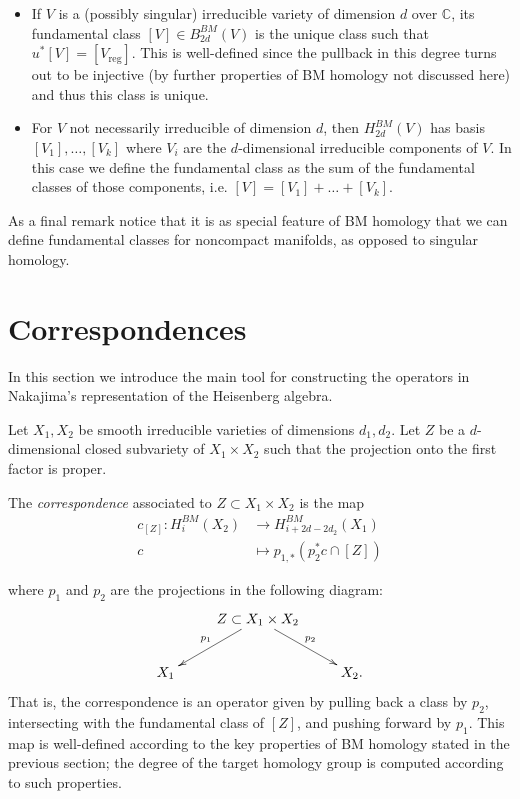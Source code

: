 \begin{enumerate}
\begin{itemize}
\item If $V$ is a (possibly singular)
irreducible variety of dimension $d$
over $\mathbb{C}$, its fundamental class
$[V] \in B_{2d}^{BM}(V)$
is the unique class such that
$u^* [V]=[V_{\text{reg}}]$.
This is well-defined since
the pullback in this degree turns
out to be injective (by further properties
of BM homology not discussed here)
and thus this class is unique.

\item For $V$ not necessarily irreducible
of dimension $d$, then $H_{2d}^{BM}(V)$
has basis $[V_1],\ldots,[V_k]$
where $V_i$ are the $d$-dimensional
irreducible components of $V$.
In this case we define the fundamental class
as the sum of the fundamental classes of
those
components, i.e. $[V]=[V_1]+\ldots+[V_k]$.
\end{itemize}
\end{enumerate}

\noindent
As a final remark notice that it is
as special feature of BM homology
that we can define fundamental classes for
noncompact manifolds, as opposed to
singular homology.

\section{Correspondences}
\label{section-correspondences}

\noindent
In this section we introduce the main tool
for constructing the operators in Nakajima's
representation
of the Heisenberg algebra.

\medskip\noindent
Let $X_1,X_2$ be smooth irreducible varieties
of dimensions $d_1,d_2$.
Let $Z$ be a $d$-dimensional
closed subvariety of $X_1\times X_2$
such that the projection onto the first
factor
is proper.

The {\it correspondence} associated to $Z
\subset X_1\times X_2$
is the map
\begin{equation}
\label{equation-correspondence}
\begin{aligned}
c_{[Z]}:H_i^{BM}(X_2)&\longrightarrow
H_{i+2d-2d_2}^{BM}(X_1)\\
c&\longmapsto p_{1,*}(p_2^*c\cap [Z])
\end{aligned}
\end{equation}

\noindent
where $p_1$ and $p_2$ are the projections in
the following diagram:
$$
\xymatrix{
&Z\ar[ld]_{p_1}\ar[rd]^{p_2} \subset
X_1\times X_2\\
X_1&&X_2.
}
$$
\noindent
That is, the correspondence is an operator
given by pulling back a class by $p_2$,
intersecting with the fundamental class of
$[Z]$,
and pushing forward by $p_1$.
This map is well-defined according
to the key properties of BM homology stated
in the previous section;
the degree of the target homology group is
computed according
to such properties.

